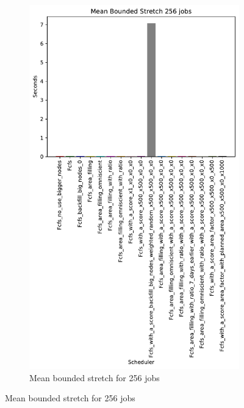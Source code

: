 \documentclass[a4paper]{article}
\begin{document}
\begin{figure}[H]
\begin{subfigure}[b]{0.4\linewidth}\centering\includegraphics[width=0.7\linewidth]{MBSS/plot/Results_Size_And_Data_2022-02-02->2022-02-03_V9532_Mean_Stretch_With_a_Minimum_256_450_128_32_256_4_1024.pdf}\caption{Mean bounded stretch for 256 jobs}\label{45}\end{subfigure}

\end{figure}
\end{document}
